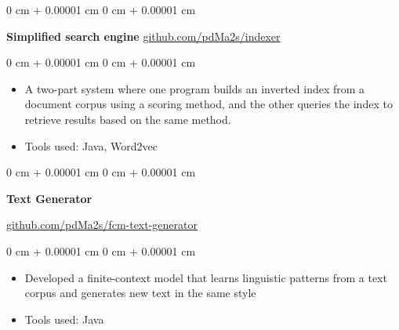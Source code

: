 \documentclass[10pt, letterpaper]{article}
\newenvironment{highlights}{
    \begin{itemize}[
        topsep=0.10 cm,
        parsep=0.10 cm,
        partopsep=0pt,
        itemsep=0pt,
        leftmargin=0 cm + 10pt
    ]
}{
    \end{itemize}
} %
\newenvironment{onecolentry}{
    \begin{adjustwidth}{
        0 cm + 0.00001 cm
    }{
        0 cm + 0.00001 cm
    }
}{
    \end{adjustwidth}
} %
\newenvironment{twocolentry}[2][]{
    \onecolentry
    \def\secondColumn{#2}
    \setcolumnwidth{\fill, 4.5 cm}
    \begin{paracol}{2}
}{
    \switchcolumn \raggedleft \secondColumn
    \end{paracol}
    \endonecolentry
} %
\newenvironment{twocolbigentry}[2][]{
    \onecolentry
    \def\secondColumn{#2}
    \setcolumnwidth{\fill, 7 cm}
    \begin{paracol}{2}
}{
    \switchcolumn \raggedleft \secondColumn
    \end{paracol}
    \endonecolentry
} %
\begin{document}
        \vspace{0.1 cm}

        \begin{twocolentry}{
            \href{https://github.com/pdMa2s/indexer}{github.com/pdMa2s/indexer}
        }
            \textbf{Simplified search engine}\end{twocolentry}

        \vspace{0.10 cm}
        \begin{onecolentry}
            \begin{highlights}
                \item A two-part system where one program builds an inverted index from a document corpus using a scoring method, and the other queries the index to retrieve results based on the same method.
                \item Tools used: Java, Word2vec
            \end{highlights}
        \end{onecolentry}

        \vspace{0.1 cm}

        \begin{twocolbigentry}{
            \href{https://github.com/pdMa2s/fcm-text-generator}{github.com/pdMa2s/fcm-text-generator}
        }
            \textbf{Text Generator}
        \end{twocolbigentry}

        \vspace{0.10 cm}
        \begin{onecolentry}
            \begin{highlights}
                \item Developed a finite-context model that learns linguistic patterns from a text corpus and generates new text in the same style
                \item Tools used: Java
            \end{highlights}
        \end{onecolentry}
         
\end{document}
